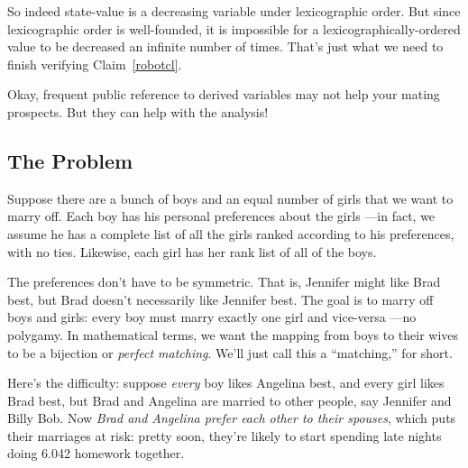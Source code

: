So indeed state-value is a decreasing variable under lexicographic order.
But since lexicographic order is well-founded, it is impossible for a
lexicographically-ordered value to be decreased an infinite number of
times.  That's just what we need to finish verifying Claim~\ref{robotcl}.
\fi

\begin{problems}
\homeworkproblems




\end{problems}


Okay, frequent public reference to derived variables may not help your
mating prospects.  But they can help with the analysis!

\subsection{The Problem}

Suppose there are a bunch of boys and an equal number of girls that we
want to marry off.  Each boy has his personal preferences about the girls
---in fact, we assume he has a complete list of all the girls ranked
according to his preferences, with no ties.  Likewise, each girl has her
rank list of all of the boys.

The preferences don't have to be symmetric.  That is, Jennifer might like
Brad best, but Brad doesn't necessarily like Jennifer best.  The goal is
to marry off boys and girls: every boy must marry exactly one girl and
vice-versa ---no polygamy.  In mathematical terms, we want the mapping
from boys to their wives to be a bijection or \emph{perfect matching}.
We'll just call this a ``matching,'' for short.

Here's the difficulty: suppose \emph{every} boy likes Angelina best, and
every girl likes Brad best, but Brad and Angelina are married to other
people, say Jennifer and Billy Bob.  Now \emph{Brad and Angelina prefer
each other to their spouses}, which puts their marriages at risk: pretty
soon, they're likely to start spending late nights doing 6.042 homework
together.

